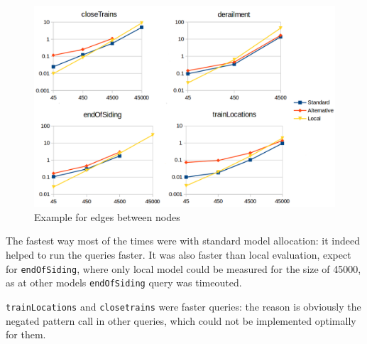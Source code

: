 \begin{figure}[h]
	\begin{center}
		\includegraphics[width=\textwidth]{figures/measurement-interpreted-code.png}
		\caption{Example for edges between nodes}
		\label{fig:measurement-interpreted-code}
	\end{center}
\end{figure}

The fastest way most of the times were with standard model allocation: it indeed helped to run the queries faster. It was also faster than local evaluation, expect for \texttt{endOfSiding}, where only local model could be measured for the size of 45000, as at other models \texttt{endOfSiding} query was timeouted.

\texttt{trainLocations} and \texttt{closetrains} were faster queries: the reason is obviously the negated pattern call in other queries, which could not be implemented optimally for them.

